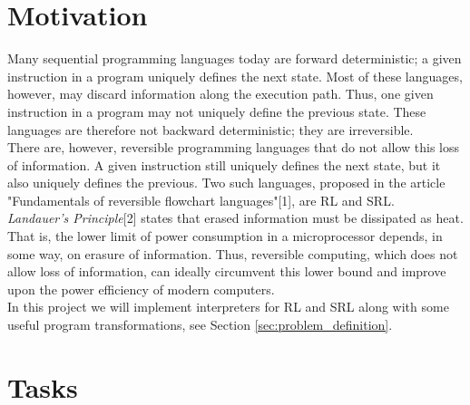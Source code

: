 \section{Motivation}
\label{sec:motivation}
Many sequential programming languages today are forward deterministic; a given instruction in a program uniquely defines the next state. Most of these languages, however, may discard information along the execution path. Thus, one given instruction in a program may not uniquely define the previous state. These languages are therefore not backward deterministic; they are irreversible. \\
\indent There are, however, reversible programming languages that do not allow this loss of information. A given instruction still uniquely defines the next state, but it also uniquely defines the previous. Two such languages, proposed in the article "Fundamentals of reversible flowchart languages"[1], are RL and SRL. \\
\indent \textit{Landauer's Principle}[2] states that erased information must be dissipated as heat. That is, the lower limit of power consumption in a microprocessor depends, in some way, on erasure of information. Thus, reversible computing, which does not allow loss of information, can ideally circumvent this lower bound and improve upon the power efficiency of modern computers. \\
\indent In this project we will implement interpreters for RL and SRL along with some useful program transformations, see Section \ref{sec:problem_definition}.

\section{Tasks}
\label{sec:tasks}

